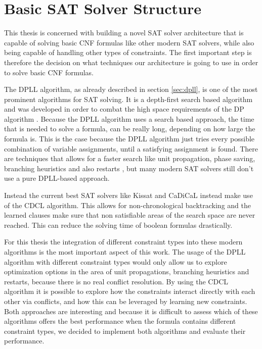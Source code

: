 \section{Basic SAT Solver Structure}

This thesis is concerned with building a novel SAT solver architecture that is capable of solving basic CNF formulas like other modern SAT solvers, while also being capable of handling other types of constraints. The first important step is therefore the decision on what techniques our architecture is going to use in order to solve basic CNF formulas.

The DPLL algorithm, as already described in section \ref{sec:dpll}, is one of the most prominent algorithms for SAT solving. It is a depth-first search based algorithm and was developed in order to combat the high space requirements of the DP algorithm \cite{biere2009handbook}. Because the DPLL algorithm uses a search based approach, the time that is needed to solve a formula, can be really long, depending on how large the formula is. This is the case because the DPLL algorithm just tries every possible combination of variable assignments, until a satisfying assignment is found. There are techniques that allows for a faster search like unit propagation, phase saving, branching heuristics and also restarts \cite{biere2009handbook}, but many modern SAT solvers still don't use a pure DPLL-based approach.

Instead the current best SAT solvers like Kissat \cite{BiereFazekasFleuryHeisinger-SAT-Competition-2020-solvers} and CaDiCaL \cite{Biere-SAT-Competition-2017-solvers} instead make use of the CDCL algorithm. This allows for non-chronological backtracking and the learned clauses make sure that non satisfiable areas of the search space are never reached. This can reduce the solving time of boolean formulas drastically. 

For this thesis the integration of different constraint types into these modern algorithms is the most important aspect of this work. The usage of the DPLL algorithm with different constraint types would only allow us to explore optimization options in the area of unit propagations, branching heuristics and restarts, because there is no real conflict resolution. By using the CDCL algorithm it is possible to explore how the constraints interact directly with each other via conflicts, and how this can be leveraged by learning new constraints. Both approaches are interesting and because it is difficult to assess which of these algorithms offers the best performance when the formula contains different constraint types, we decided to implement both algorithms and evaluate their performance.

